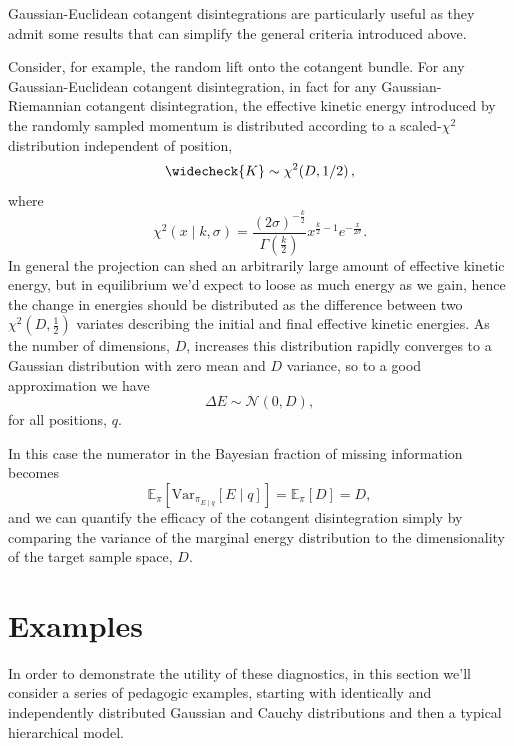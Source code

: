 \documentclass[stslayout]{imsart}
\begin{document}
Gaussian-Euclidean cotangent disintegrations are particularly useful as 
they admit some results that can simplify the general criteria introduced
above.

Consider, for example, the random lift onto the cotangent bundle.
For any Gaussian-Euclidean cotangent disintegration, in fact for any 
Gaussian-Riemannian cotangent disintegration, the effective kinetic energy 
introduced by the randomly sampled momentum is distributed according 
to a scaled-$\chi^{2}$ distribution independent of position, 
%
\begin{equation*}
\widecheck{K} \sim \chi^{2} \! \left( D, 1 / 2 \right),
\end{equation*}
%
where
%
\begin{equation*}
\chi^{2} \! \left( x \mid k, \sigma \right)
=
\frac{ \left( 2 \sigma \right)^{-\frac{k}{2}} }{ \Gamma \! \left( \frac{k}{2} \right) }
x^{\frac{k}{2} - 1} e^{-\frac{x}{2 \sigma} }.
\end{equation*}
%
In general the projection can shed an arbitrarily large amount of effective
kinetic energy, but in equilibrium we'd expect to loose as much energy 
as we gain, hence the change in energies should be distributed as the 
difference between two $\chi^{2} \! \left( D, \frac{1}{2} \right)$ variates
describing the initial and final effective kinetic energies.  As the number of
dimensions, $D$, increases this distribution rapidly converges to a Gaussian 
distribution with zero mean and $D$ variance, so to a good approximation 
we have
%
\begin{equation*}
\Delta E \sim \mathcal{N} \! \left( 0, D \right),
\end{equation*}
%
for all positions, $q$. 

In this case the numerator in the Bayesian fraction of missing information
becomes
%
\begin{equation*}
\mathbb{E}_{\pi} \! 
\left[ \mathrm{Var}_{ \pi_{E \mid q} } \! \left[ E \mid q \right] \right]
=
 \mathbb{E}_{\pi} \! 
\left[ D \right]
= D,
\end{equation*}
%
and we can quantify the efficacy of the cotangent disintegration simply
by comparing the variance of the marginal energy distribution to the
dimensionality of the target sample space, $D$.

\section{Examples}

In order to demonstrate the utility of these diagnostics, in this section
we'll consider a series of pedagogic examples, starting with identically 
and independently distributed Gaussian and Cauchy distributions and 
then a typical hierarchical model.  
\end{document}
